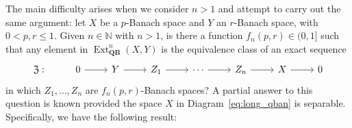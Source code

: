 \documentclass[12pt,a4paper]{amsproc}
\theoremstyle{remark}
\theoremstyle{definition}
\newcommand{\Ext}{\operatorname{Ext}}
\newcommand{\QBan}{\operatorname{\textbf{QB}}}
\numberwithin{equation}{section}
\begin{document}
The main difficulty arises when we consider $n > 1$ and attempt to carry out the same argument: let $X$ be a $p$-Banach space and $Y$ an $r$-Banach space, with $0 < p, r \le 1$. Given $n \in \mathbb{N}$ with $n > 1$, is there a function $f_n(p,r) \in (0,1]$ such that any element in $\Ext^n_{\QBan}(X,Y)$ is the equivalence class of an exact sequence
\begin{equation} \label{eq:long_qban}
\begin{tikzcd}
    \mathfrak{Z}: & 0 \arrow[r] & Y \arrow[r] & Z_1 \arrow[r] & \cdots \arrow[r] & Z_n \arrow[r] & X \arrow[r] & 0 
\end{tikzcd}
\end{equation}
in which $Z_1, \dots, Z_n$ are $f_n(p,r)$-Banach spaces? A partial answer to this question is known provided the space $X$ in Diagram~\ref{eq:long_qban} is separable. Specifically, we have the following result:
\end{document}
